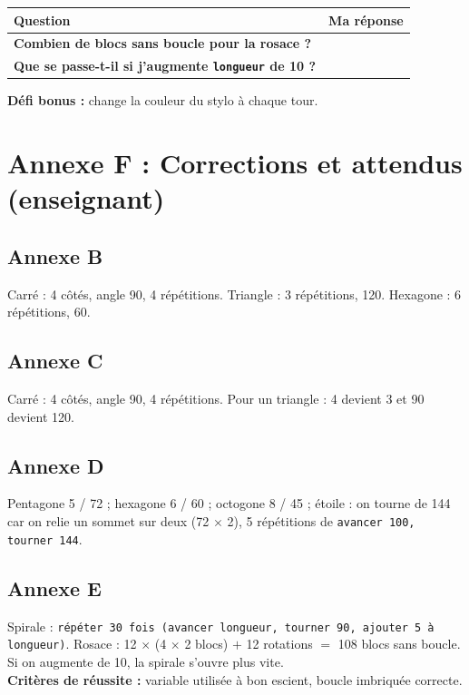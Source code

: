 \documentclass[11pt,a4paper]{article}
\begin{document}
\begin{tabularx}{\linewidth}{>{\bfseries}p{4cm}Y}
\toprule
Question & Ma réponse\\
\midrule
Combien de blocs sans boucle pour la rosace ? & \\
Que se passe-t-il si j'augmente \texttt{longueur} de 10 ? & \\
\bottomrule
\end{tabularx}

\textbf{Défi bonus :} change la couleur du stylo à chaque tour.

\newpage
\section*{Annexe F : Corrections et attendus (enseignant)}

\subsection*{Annexe B}
Carré : 4 côtés, angle 90, 4 répétitions. Triangle : 3 répétitions, 120. Hexagone : 6 répétitions, 60.

\subsection*{Annexe C}
Carré : 4 côtés, angle 90, 4 répétitions. Pour un triangle : 4 devient 3 et 90 devient 120.

\subsection*{Annexe D}
Pentagone 5 / 72 ; hexagone 6 / 60 ; octogone 8 / 45 ; étoile : on tourne de 144 car on relie un sommet sur deux (72 $\times$ 2), 5 répétitions de \texttt{avancer 100, tourner 144}.

\subsection*{Annexe E}
Spirale : \texttt{répéter 30 fois (avancer longueur, tourner 90, ajouter 5 à longueur)}. Rosace : 12 $\times$ (4 $\times$ 2 blocs) $+$ 12 rotations $=$ 108 blocs sans boucle. Si on augmente de 10, la spirale s'ouvre plus vite.\\
\textbf{Critères de réussite :} variable utilisée à bon escient, boucle imbriquée correcte.

\newpage
\end{document}
